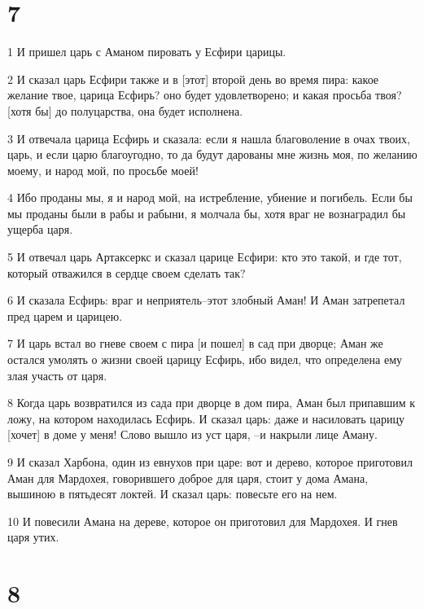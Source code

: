 \chapter{7}

\par 1 И пришел царь с Аманом пировать у Есфири царицы.
\par 2 И сказал царь Есфири также и в [этот] второй день во время пира: какое желание твое, царица Есфирь? оно будет удовлетворено; и какая просьба твоя? [хотя бы] до полуцарства, она будет исполнена.
\par 3 И отвечала царица Есфирь и сказала: если я нашла благоволение в очах твоих, царь, и если царю благоугодно, то да будут дарованы мне жизнь моя, по желанию моему, и народ мой, по просьбе моей!
\par 4 Ибо проданы мы, я и народ мой, на истребление, убиение и погибель. Если бы мы проданы были в рабы и рабыни, я молчала бы, хотя враг не вознаградил бы ущерба царя.
\par 5 И отвечал царь Артаксеркс и сказал царице Есфири: кто это такой, и где тот, который отважился в сердце своем сделать так?
\par 6 И сказала Есфирь: враг и неприятель--этот злобный Аман! И Аман затрепетал пред царем и царицею.
\par 7 И царь встал во гневе своем с пира [и пошел] в сад при дворце; Аман же остался умолять о жизни своей царицу Есфирь, ибо видел, что определена ему злая участь от царя.
\par 8 Когда царь возвратился из сада при дворце в дом пира, Аман был припавшим к ложу, на котором находилась Есфирь. И сказал царь: даже и насиловать царицу [хочет] в доме у меня! Слово вышло из уст царя, --и накрыли лице Аману.
\par 9 И сказал Харбона, один из евнухов при царе: вот и дерево, которое приготовил Аман для Мардохея, говорившего доброе для царя, стоит у дома Амана, вышиною в пятьдесят локтей. И сказал царь: повесьте его на нем.
\par 10 И повесили Амана на дереве, которое он приготовил для Мардохея. И гнев царя утих.

\chapter{8}

